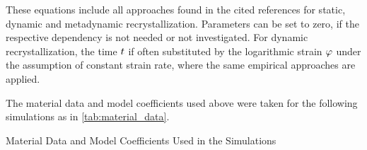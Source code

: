 These equations include all approaches found in the cited references for static, dynamic and metadynamic recrystallization.
Parameters can be set to zero, if the respective dependency is not needed or not investigated.
For dynamic recrystallization, the time ${t}$ if often substituted by the logarithmic strain ${\varphi}$ under the assumption of constant strain rate, where the same empirical approaches are applied.

The material data and model coefficients used above were taken for the following simulations as in \autoref{tab:material_data}.

\begin{table}
    \centering
    \caption{Material Data and Model Coefficients Used in the Simulations}
    \label{tab:material_data}
    
\end{table}


